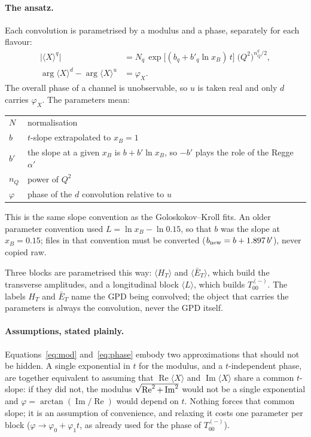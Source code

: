 \paragraph{The ansatz.}
Each convolution is parametrised by a modulus and a phase, separately for each
flavour:
\begin{align}
\bigl|\langle X\rangle^q\bigr| &= N_q \,
   \exp\!\big[(b_q + b'_q \ln x_B)\, t\big]\;
   \big(Q^2\big)^{n_Q^q/2},
\label{eq:mod}\\[2pt]
\arg\langle X\rangle^{d} - \arg\langle X\rangle^{u} &= \varphi_X .
\label{eq:phase}
\end{align}
The overall phase of a channel is unobservable, so $u$ is taken real and only
$d$ carries $\varphi_X$.  The parameters mean:

\begin{center}
\begin{tabular}{ll}
\toprule
$N$        & normalisation \\
$b$        & $t$-slope extrapolated to $x_B = 1$ \\
$b'$       & the slope at a given $x_B$ is $b + b'\ln x_B$, so $-b'$ plays the
             role of the Regge $\alpha'$ \\
$n_Q$      & power of $Q^2$ \\
$\varphi$  & phase of the $d$ convolution relative to $u$ \\
\bottomrule
\end{tabular}
\end{center}

\noindent
This is the same slope convention as the Goloskokov--Kroll fits.  An older
parameter convention used $L = \ln x_B - \ln 0.15$, so that $b$ was the slope
at $x_B = 0.15$; files in that convention must be converted
($b_{\rm new} = b + 1.897\,b'$), never copied raw.

Three blocks are parametrised this way: $\langle H_T\rangle$ and
$\langle \bar E_T\rangle$, which build the transverse amplitudes, and a
longitudinal block $\langle L\rangle$, which builds $T_{00}^{(-)}$.  The
labels $H_T$ and $\bar E_T$ name the GPD being convolved; the object that
carries the parameters is always the convolution, never the GPD itself.

\paragraph{Assumptions, stated plainly.}
Equations~\eqref{eq:mod} and~\eqref{eq:phase} embody two approximations that
should not be hidden.  A single exponential in $t$ for the modulus, and a
$t$-independent phase, are together equivalent to assuming that
$\operatorname{Re}\langle X\rangle$ and $\operatorname{Im}\langle X\rangle$
share a common $t$-slope: if they did not, the modulus
$\sqrt{\smash[b]{\operatorname{Re}^2 + \operatorname{Im}^2}}$ would not be a
single exponential and $\varphi = \arctan(\operatorname{Im}/\operatorname{Re})$
would depend on $t$.  Nothing forces that common slope; it is an assumption of
convenience, and relaxing it costs one parameter per block
($\varphi \to \varphi_0 + \varphi_1 t$, as already used for the phase of
$T_{00}^{(-)}$).

